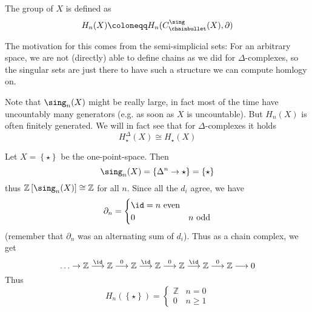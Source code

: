 \begin{definition}\label{def:singular-homlogy}
    The  group of $X$ is defined as
    \[
        H_n(X) \coloneqq  H_n(C_{\chainbullet}^{\sing}(X),\partial)
    \] 
\end{definition}

\begin{oral}
    The motivation for this comes from the semi-simplicial sets: For an arbitrary space, we are not (directly) able to define chains as we did for  $\Delta$-complexes, so the singular sets are just there to have such a structure we can compute homlogy on.
\end{oral}


\begin{remark}
    Note that $\sing_n(X)$ might be really large, in fact most of the time have uncountably many generators (e.g. as soon as $X$ is uncountable). But  $H_n(X)$ is often finitely generated. We will in fact see that for  $\Delta$-complexes it holds
    \[
        H_{\star}^{\Delta}(X) \cong H_{\star}(X)
    \] 
\end{remark}

\begin{example}\label{ex:singular-homology-of-one-point-space}
    Let $X = \left \{\star\right\}$ be the one-point-space. Then
    \[
        \sing_n(X) = \left \{\Delta^n \to  \star\right\}  = \left \{\star\right\} 
    \] 
    thus $\mathbb{Z}\left[ \sing_n(X) \right] \cong \mathbb{Z}$ for all $n$. Since all the  $d_i$ agree, we have 
    \[
    \partial_n = \begin{cases}
        \id = n \text{ even} \\
        0 & n \text{ odd}
    \end{cases}
    \] 
    (remember that $\partial_n$ was an alternating sum of $d_i$). Thus as a chain complex, we get
     \[
 \ldots \to    \mathbb{Z} \stackrel{\id}{\longrightarrow} \mathbb{Z} \stackrel{0}{\longrightarrow}\mathbb{Z} \stackrel{\id}{\longrightarrow} \mathbb{Z}\stackrel{0}{\longrightarrow} \mathbb{Z} \stackrel{\id}{\longrightarrow} \mathbb{Z} \stackrel{0}{\longrightarrow} \mathbb{Z} \stackrel{}{\longrightarrow} 0
    \] 
    Thus
    \[
        H_n(\left \{\star\right\} ) = \begin{cases}
            \mathbb{Z} & n = 0 \\
            0 & n\geq 1
        \end{cases}
    \] 
\end{example}
